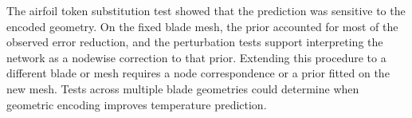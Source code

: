 \documentclass[a4paper,fleqn]{cas-sc}
\begin{document}
The airfoil token substitution test showed that the prediction was sensitive
to the encoded geometry. On the fixed blade mesh, the prior accounted for
most of the observed error reduction, and the perturbation tests support
interpreting the network as a nodewise correction to that prior. Extending
this procedure to a different blade or mesh requires a node correspondence
or a prior fitted on the new mesh. Tests across multiple blade geometries
could determine when geometric encoding improves temperature prediction.

\printcredits

\appendix





\end{document}
